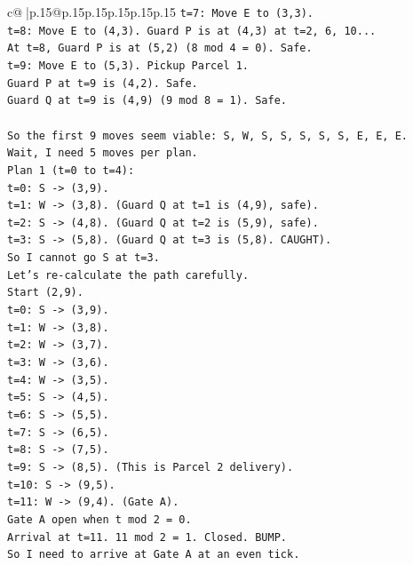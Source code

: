 \documentclass{article}
\begin{document}
{\begin{supertabular}{c@{$\;$}|p{.15\linewidth}@{}p{.15\linewidth}p{.15\linewidth}p{.15\linewidth}p{.15\linewidth}p{.15\linewidth}}
{{{\texttt{t=7: Move E to (3,3).} \\
\texttt{t=8: Move E to (4,3). Guard P is at (4,3) at t=2, 6, 10...} \\
\texttt{At t=8, Guard P is at (5,2) (8 mod 4 = 0). Safe.} \\
\texttt{t=9: Move E to (5,3). Pickup Parcel 1.} \\
\texttt{Guard P at t=9 is (4,2). Safe.} \\
\texttt{Guard Q at t=9 is (4,9) (9 mod 8 = 1). Safe.} \\
\\ 
\texttt{So the first 9 moves seem viable: S, W, S, S, S, S, S, E, E, E.} \\
\texttt{Wait, I need 5 moves per plan.} \\
\texttt{Plan 1 (t=0 to t=4):} \\
\texttt{t=0: S {-}> (3,9).} \\
\texttt{t=1: W {-}> (3,8). (Guard Q at t=1 is (4,9), safe).} \\
\texttt{t=2: S {-}> (4,8). (Guard Q at t=2 is (5,9), safe).} \\
\texttt{t=3: S {-}> (5,8). (Guard Q at t=3 is (5,8). CAUGHT).} \\
\texttt{So I cannot go S at t=3.} \\
\texttt{Let's re{-}calculate the path carefully.} \\
\texttt{Start (2,9).} \\
\texttt{t=0: S {-}> (3,9).} \\
\texttt{t=1: W {-}> (3,8).} \\
\texttt{t=2: W {-}> (3,7).} \\
\texttt{t=3: W {-}> (3,6).} \\
\texttt{t=4: W {-}> (3,5).} \\
\texttt{t=5: S {-}> (4,5).} \\
\texttt{t=6: S {-}> (5,5).} \\
\texttt{t=7: S {-}> (6,5).} \\
\texttt{t=8: S {-}> (7,5).} \\
\texttt{t=9: S {-}> (8,5). (This is Parcel 2 delivery).} \\
\texttt{t=10: S {-}> (9,5).} \\
\texttt{t=11: W {-}> (9,4). (Gate A).} \\
\texttt{Gate A open when t mod 2 = 0.} \\
\texttt{Arrival at t=11. 11 mod 2 = 1. Closed. BUMP.} \\
\texttt{So I need to arrive at Gate A at an even tick.} \\
}}}
\end{supertabular}}
\end{document}
